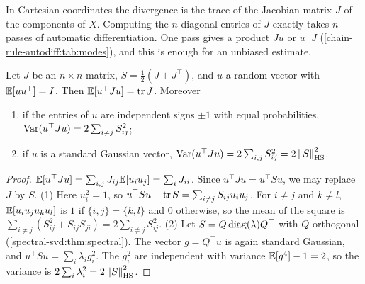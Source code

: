 \begin{notechapter}
In Cartesian coordinates the divergence is the trace of the Jacobian
matrix $J$ of the components of $X$. Computing the $n$ diagonal entries
of $J$ exactly takes $n$ passes of automatic differentiation. One pass
gives a product $Ju$ or $u^\top J$
(\cref{chain-rule-autodiff:tab:modes}), and this is enough for an
unbiased estimate.

\begin{proposition}
\label{vector-calculus:prop:hutchinson}
Let $J$ be an $n\times n$ matrix, $S = \frac12(J + J^\top)$, and $u$ a
random vector with $\mathbb{E}[uu^\top] = I$. Then
$\mathbb{E}[u^\top Ju] = \operatorname{tr} J$. Moreover
\begin{enumerate}[nosep]
  \item if the entries of $u$ are independent signs $\pm1$ with equal
        probabilities, $\operatorname{Var}(u^\top Ju) = 2\sum_{i\neq j}S_{ij}^2$;
  \item if $u$ is a standard Gaussian vector,
        $\operatorname{Var}(u^\top Ju) = 2\sum_{i,j}S_{ij}^2 = 2\left\|S\right\|_{\mathrm{HS}}^2$.
\end{enumerate}
\end{proposition}

\begin{proof}
$\mathbb{E}[u^\top Ju] = \sum_{i,j}J_{ij}\mathbb{E}[u_iu_j] = \sum_iJ_{ii}$. Since
$u^\top Ju = u^\top Su$, we may replace $J$ by $S$. (1) Here
$u_i^2 = 1$, so $u^\top Su - \operatorname{tr} S = \sum_{i\neq j}S_{ij}u_iu_j$. For
$i\neq j$ and $k\neq l$, $\mathbb{E}[u_iu_ju_ku_l]$ is $1$ if
$\{i, j\} = \{k, l\}$ and $0$ otherwise, so the mean of the square is
$\sum_{i\neq j}(S_{ij}^2 + S_{ij}S_{ji}) = 2\sum_{i\neq j}S_{ij}^2$.
(2) Let $S = Q\operatorname{diag}(\lambda)Q^\top$ with $Q$ orthogonal
(\cref{spectral-svd:thm:spectral}). The vector $g = Q^\top u$ is again
standard Gaussian, and $u^\top Su = \sum_i\lambda_ig_i^2$. The $g_i^2$
are independent with variance $\mathbb{E}[g^4] - 1 = 2$, so the variance is
$2\sum_i\lambda_i^2 = 2\left\|S\right\|_{\mathrm{HS}}^2$.
\end{proof}


\end{notechapter}

